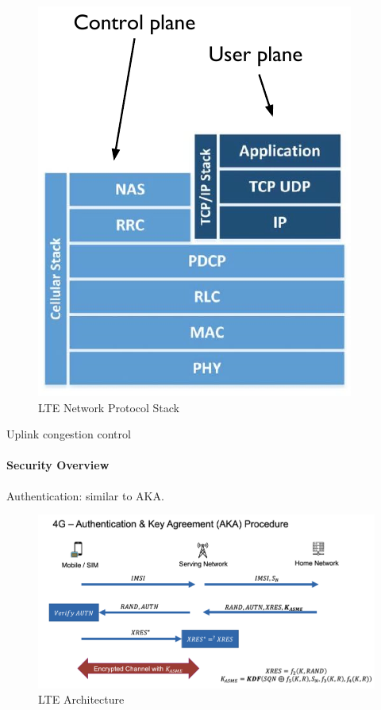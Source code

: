 \begin{figure}[h]
	\centering
	\includegraphics[scale=0.5]{images/10-4g-network-stack.png}
	\caption{LTE Network Protocol Stack}%
	\label{fig:4g-network-stack}
\end{figure}

Uplink congestion control

\paragraph{Security Overview}
Authentication: similar to AKA.

\begin{figure}[h]
	\centering
	\includegraphics[scale=0.3]{images/10-4g-aka.png}
	\caption{LTE Architecture}%
	\label{fig:4g-aka}
\end{figure}

